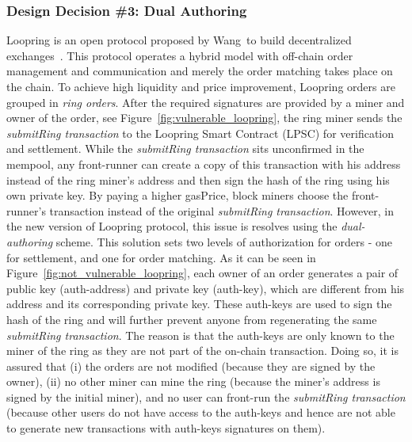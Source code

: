 \subsubsection{Design Decision \#3: Dual Authoring\newline} %
Loopring is an open protocol proposed by Wang~\etal to build decentralized exchanges~\cite{wang2018loopring}. This protocol operates a hybrid model with off-chain order management and communication and merely the order matching takes place on the chain. To achieve high liquidity and price improvement, Loopring orders are grouped in \emph{ring orders}. After the required signatures are provided by a miner and owner of the order, see Figure~\ref{fig:vulnerable_loopring}, the ring miner sends the \emph{submitRing transaction} to the Loopring Smart Contract (LPSC) for verification and settlement. While the \emph{submitRing transaction} sits unconfirmed in the mempool, any front-runner can create a copy of this transaction with his address instead of the ring miner's address and then sign the hash of the ring using his own private key. By paying a higher gasPrice, block miners choose the front-runner's transaction instead of the original \emph{submitRing transaction}. However, in the new version of Loopring protocol, this issue is resolves using the \emph{dual-authoring} scheme. This solution sets two levels of authorization for orders - one for settlement, and one for order matching. As it can be seen in Figure~\ref{fig:not_vulnerable_loopring}, each owner of an order generates a pair of public key (auth-address) and private key (auth-key), which are different from his address and its corresponding private key. These auth-keys are used to sign the hash of the ring and will further prevent anyone from regenerating the same \emph{submitRing transaction}. The reason is that the auth-keys are only known to the miner of the ring as they are not part of the on-chain transaction. Doing so, it is assured that (i) the orders are not modified (because they are signed by the owner), (ii) no other miner can mine the ring (because the miner's address is signed by the initial miner), and no user can front-run the \emph{submitRing transaction} (because other users do not have access to the auth-keys and hence are not able to generate new transactions with auth-keys signatures on them).



